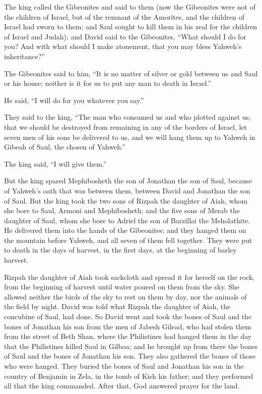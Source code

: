  The king called the Gibeonites and said to them (now the
Gibeonites were not of the children of Israel, but of the remnant of the
Amorites, and the children of Israel had sworn to them; and Saul sought
to kill them in his zeal for the children of Israel and Judah);
 and David said to the Gibeonites, ``What should I do for
you? And with what should I make atonement, that you may bless Yahweh's
inheritance?''

 The Gibeonites said to him, ``It is no matter of silver
or gold between us and Saul or his house; neither is it for us to put
any man to death in Israel.''

He said, ``I will do for you whatever you say.''

 They said to the king, ``The man who consumed us and who
plotted against us, that we should be destroyed from remaining in any of
the borders of Israel,  let seven men of his sons be
delivered to us, and we will hang them up to Yahweh in Gibeah of Saul,
the chosen of Yahweh.''

The king said, ``I will give them.''

 But the king spared Mephibosheth the son of Jonathan the
son of Saul, because of Yahweh's oath that was between them, between
David and Jonathan the son of Saul.  But the king took the
two sons of Rizpah the daughter of Aiah, whom she bore to Saul, Armoni
and Mephibosheth; and the five sons of Merab the daughter of Saul, whom
she bore to Adriel the son of Barzillai the Meholathite. 
He delivered them into the hands of the Gibeonites; and they hanged them
on the mountain before Yahweh, and all seven of them fell together. They
were put to death in the days of harvest, in the first days, at the
beginning of barley harvest.

 Rizpah the daughter of Aiah took sackcloth and spread it
for herself on the rock, from the beginning of harvest until water
poured on them from the sky. She allowed neither the birds of the sky to
rest on them by day, nor the animals of the field by night.
 David was told what Rizpah the daughter of Aiah, the
concubine of Saul, had done.  So David went and took the
bones of Saul and the bones of Jonathan his son from the men of Jabesh
Gilead, who had stolen them from the street of Beth Shan, where the
Philistines had hanged them in the day that the Philistines killed Saul
in Gilboa;  and he brought up from there the bones of
Saul and the bones of Jonathan his son. They also gathered the bones of
those who were hanged.  They buried the bones of Saul and
Jonathan his son in the country of Benjamin in Zela, in the tomb of Kish
his father; and they performed all that the king commanded. After that,
God answered prayer for the land.


